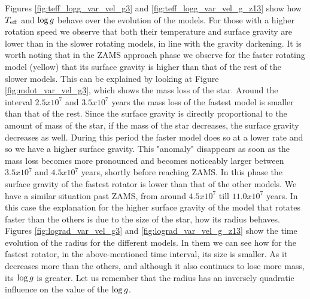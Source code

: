 \documentclass[fleqn,usenatbib]{mnras}
\begin{document}
Figures \ref{fig:teff_logg_var_vel_g3} and \ref{fig:teff_logg_var_vel_g_z13} show how $T_{\mathrm{eff}}$ and $\mathrm{log} \, g$ behave over the evolution of the models. For those with a higher rotation speed we observe that both their temperature and surface gravity are lower than in the slower rotating models, in line with the gravity darkening. It is worth noting that in the ZAMS approach phase we observe for the faster rotating model (yellow) that its surface gravity is higher than that of the rest of the slower models. This can be explained by looking at Figure \ref{fig:mdot_var_vel_g3}, which shows the mass loss of the star. Around the interval $2.5x10^{7}$ and $3.5x10^{7}$ years the mass loss of the fastest model is smaller than that of the rest. Since the surface gravity is directly proportional to the amount of mass of the star, if the mass of the star decreases, the surface gravity decreases as well. During this period the faster model does so at a lower rate and so we have a higher surface gravity. This "anomaly" disappears as soon as the mass loss becomes more pronounced and becomes noticeably larger between $3.5x10^{7}$ and $4.5x10^{7}$ years, shortly before reaching ZAMS. In this phase the surface gravity of the fastest rotator is lower than that of the other models. We have a similar situation past ZAMS, from around $4.5x10^{7}$ till $11.0x10^{7}$ years. In this case the explanation for the higher surface gravity of the model that rotates faster than the others is due to the size of the star, how its radius behaves. Figures \ref{fig:lograd_var_vel_g3} and \ref{fig:lograd_var_vel_g_z13} show the time evolution of the radius for the different models. In them we can see how for the fastest rotator, in the above-mentioned time interval, its size is smaller. As it decreases more than the others, and although it also continues to lose more mass, its $\mathrm{log} \, g$ is greater. Let us remember that the radius has an inversely quadratic influence on the value of the $\mathrm{log} \, g$.\par
\end{document}

